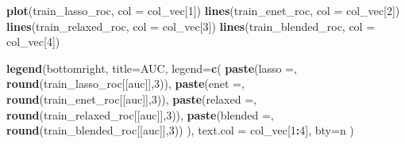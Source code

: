 \documentclass[
]{book}
\newenvironment{Shaded}{\begin{snugshade}}{\end{snugshade}}
\newcommand{\DataTypeTok}[1]{\textcolor[rgb]{0.13,0.29,0.53}{#1}}
\newcommand{\DecValTok}[1]{\textcolor[rgb]{0.00,0.00,0.81}{#1}}
\newcommand{\KeywordTok}[1]{\textcolor[rgb]{0.13,0.29,0.53}{\textbf{#1}}}
\newcommand{\NormalTok}[1]{#1}
\newcommand{\OperatorTok}[1]{\textcolor[rgb]{0.81,0.36,0.00}{\textbf{#1}}}
\newcommand{\StringTok}[1]{\textcolor[rgb]{0.31,0.60,0.02}{#1}}
\begin{document}
\begin{Shaded}
\begin{Highlighting}[]
\KeywordTok{plot}\NormalTok{(train\_lasso\_roc, }\DataTypeTok{col =}\NormalTok{ col\_vec[}\DecValTok{1}\NormalTok{])}
\KeywordTok{lines}\NormalTok{(train\_enet\_roc, }\DataTypeTok{col =}\NormalTok{ col\_vec[}\DecValTok{2}\NormalTok{])}
\KeywordTok{lines}\NormalTok{(train\_relaxed\_roc, }\DataTypeTok{col =}\NormalTok{ col\_vec[}\DecValTok{3}\NormalTok{])}
\KeywordTok{lines}\NormalTok{(train\_blended\_roc, }\DataTypeTok{col =}\NormalTok{ col\_vec[}\DecValTok{4}\NormalTok{])}

\KeywordTok{legend}\NormalTok{(}\StringTok{\textquotesingle{}bottomright\textquotesingle{}}\NormalTok{, }\DataTypeTok{title=}\StringTok{\textquotesingle{}AUC\textquotesingle{}}\NormalTok{,}
 \DataTypeTok{legend=}\KeywordTok{c}\NormalTok{(}
  \KeywordTok{paste}\NormalTok{(}\StringTok{\textquotesingle{}lasso =\textquotesingle{}}\NormalTok{, }\KeywordTok{round}\NormalTok{(train\_lasso\_roc[[}\StringTok{\textquotesingle{}auc\textquotesingle{}}\NormalTok{]],}\DecValTok{3}\NormalTok{)),}
  \KeywordTok{paste}\NormalTok{(}\StringTok{\textquotesingle{}enet =\textquotesingle{}}\NormalTok{, }\KeywordTok{round}\NormalTok{(train\_enet\_roc[[}\StringTok{\textquotesingle{}auc\textquotesingle{}}\NormalTok{]],}\DecValTok{3}\NormalTok{)),}
  \KeywordTok{paste}\NormalTok{(}\StringTok{\textquotesingle{}relaxed =\textquotesingle{}}\NormalTok{, }\KeywordTok{round}\NormalTok{(train\_relaxed\_roc[[}\StringTok{\textquotesingle{}auc\textquotesingle{}}\NormalTok{]],}\DecValTok{3}\NormalTok{)),}
  \KeywordTok{paste}\NormalTok{(}\StringTok{\textquotesingle{}blended =\textquotesingle{}}\NormalTok{, }\KeywordTok{round}\NormalTok{(train\_blended\_roc[[}\StringTok{\textquotesingle{}auc\textquotesingle{}}\NormalTok{]],}\DecValTok{3}\NormalTok{))}
\NormalTok{ ),}
 \DataTypeTok{text.col =}\NormalTok{ col\_vec[}\DecValTok{1}\OperatorTok{:}\DecValTok{4}\NormalTok{],}
 \DataTypeTok{bty=}\StringTok{\textquotesingle{}n\textquotesingle{}}
\NormalTok{)}
\end{Highlighting}
\end{Shaded}
\end{document}
